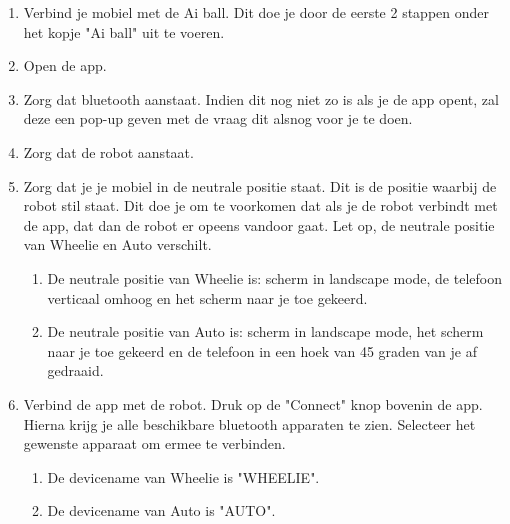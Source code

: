 \documentclass[12pt,a4paper]{article}
\begin{document}
\begin{enumerate}
	\item Verbind je mobiel met de Ai ball. Dit doe je door de eerste 2 stappen onder het kopje "Ai ball" uit te voeren.
	\item Open de app.
	\item Zorg dat bluetooth aanstaat. Indien dit nog niet zo is als je de app opent, zal deze een pop-up geven met de vraag dit alsnog voor je te doen. 
	\item Zorg dat de robot aanstaat. 
	\item Zorg dat je je mobiel in de neutrale positie staat. Dit is de positie waarbij de robot stil staat. Dit doe je om te voorkomen dat als je de robot verbindt met de app, dat dan de robot er opeens vandoor gaat. Let op, de neutrale positie van Wheelie en Auto verschilt. 
	\begin{enumerate}
		\item De neutrale positie van Wheelie is: scherm in landscape mode, de telefoon verticaal omhoog en het scherm naar je toe gekeerd.
		\item De neutrale positie van Auto is: scherm in landscape mode, het scherm naar je toe gekeerd en de telefoon in een hoek van 45 graden van je af gedraaid. 
	\end{enumerate} 
	\item Verbind de app met de robot. Druk op de "Connect" knop bovenin de app. Hierna krijg je alle beschikbare bluetooth apparaten te zien. Selecteer het gewenste apparaat om ermee te verbinden.
	\begin{enumerate}
		\item De devicename van Wheelie is "WHEELIE".
		\item De devicename van Auto is "AUTO".
	\end{enumerate}
\end{enumerate}
\end{document}
